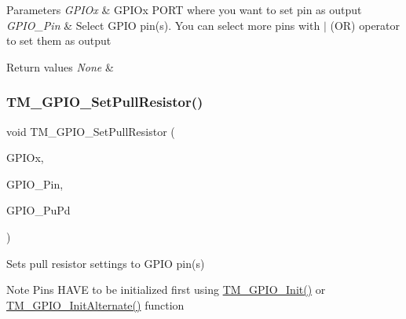 \begin{DoxyParams}{Parameters}
{\em G\+P\+I\+Ox} & G\+P\+I\+Ox P\+O\+RT where you want to set pin as output \\
\hline
{\em G\+P\+I\+O\+\_\+\+Pin} & Select G\+P\+IO pin(s). You can select more pins with $\vert$ (OR) operator to set them as output \\
\hline
\end{DoxyParams}

\begin{DoxyRetVals}{Return values}
{\em None} & \\
\hline
\end{DoxyRetVals}
\mbox{\label{group___t_m___g_p_i_o___functions_ga2c9473d78b1c2f5031d914a38bab036a}} 
\subsubsection{\texorpdfstring{T\+M\+\_\+\+G\+P\+I\+O\+\_\+\+Set\+Pull\+Resistor()}{TM\_GPIO\_SetPullResistor()}}
{\footnotesize\ttfamily void T\+M\+\_\+\+G\+P\+I\+O\+\_\+\+Set\+Pull\+Resistor (\begin{DoxyParamCaption}\item[{G\+P\+I\+O\+\_\+\+Type\+Def $\ast$}]{G\+P\+I\+Ox,  }\item[{uint16\+\_\+t}]{G\+P\+I\+O\+\_\+\+Pin,  }\item[{\hyperlink{group___t_m___g_p_i_o___typedefs_ga50ddb0da56d8a388dee368c55e968602}{T\+M\+\_\+\+G\+P\+I\+O\+\_\+\+Pu\+Pd\+\_\+t}}]{G\+P\+I\+O\+\_\+\+Pu\+Pd }\end{DoxyParamCaption})}



Sets pull resistor settings to G\+P\+IO pin(s) 

\begin{DoxyNote}{Note}
Pins H\+A\+VE to be initialized first using \hyperlink{group___t_m___g_p_i_o___functions_ga7ea61719f45c8d46e56f636d7ffdf0d0}{T\+M\+\_\+\+G\+P\+I\+O\+\_\+\+Init()} or \hyperlink{group___t_m___g_p_i_o___functions_gac91349d1bf42b50463ebc2716130eb89}{T\+M\+\_\+\+G\+P\+I\+O\+\_\+\+Init\+Alternate()} function 
\end{DoxyNote}

